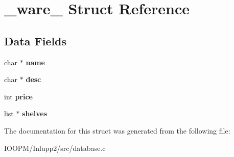 \hypertarget{struct__ware__}{}\section{\+\_\+ware\+\_\+ Struct Reference}
\label{struct__ware__}
\subsection*{Data Fields}
\begin{DoxyCompactItemize}
\item 
\hypertarget{struct__ware___a5ac083a645d964373f022d03df4849c8}{}char $\ast$ {\bfseries name}\label{struct__ware___a5ac083a645d964373f022d03df4849c8}

\item 
\hypertarget{struct__ware___a3aad16fd4bea1b9717f232ea75ad6449}{}char $\ast$ {\bfseries desc}\label{struct__ware___a3aad16fd4bea1b9717f232ea75ad6449}

\item 
\hypertarget{struct__ware___aef7c2446a93a7dc07f65981daf37fa65}{}int {\bfseries price}\label{struct__ware___aef7c2446a93a7dc07f65981daf37fa65}

\item 
\hypertarget{struct__ware___a37ee6cf25bdd3f2b3d456764e1bdc148}{}\hyperlink{struct__list__}{list} $\ast$ {\bfseries shelves}\label{struct__ware___a37ee6cf25bdd3f2b3d456764e1bdc148}

\end{DoxyCompactItemize}


The documentation for this struct was generated from the following file\+:\begin{DoxyCompactItemize}
\item 
I\+O\+O\+P\+M/\+Inlupp2/src/database.\+c\end{DoxyCompactItemize}
